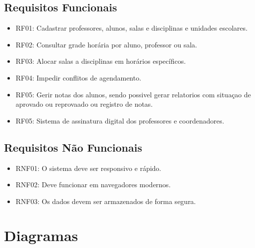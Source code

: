 \documentclass[12pt,a4paper]{report}
\begin{document}
\section{Requisitos Funcionais}
\begin{itemize}
    \item RF01: Cadastrar professores, alunos, salas e disciplinas e unidades escolares.
    \item RF02: Consultar grade horária por aluno, professor ou sala.
    \item RF03: Alocar salas a disciplinas em horários específicos.
    \item RF04: Impedir conflitos de agendamento.
    \item RF05: Gerir notas dos alunos, sendo possivel gerar relatorios com situaçao de aprovado ou reprovaado ou registro de notas.
    \item RF05: Sistema de assinatura digital dos professores e coordenadores.
\end{itemize}

\section{Requisitos Não Funcionais}
\begin{itemize}
    \item RNF01: O sistema deve ser responsivo e rápido.
    \item RNF02: Deve funcionar em navegadores modernos.
    \item RNF03: Os dados devem ser armazenados de forma segura.
\end{itemize}

\chapter{Diagramas}
\end{document}
